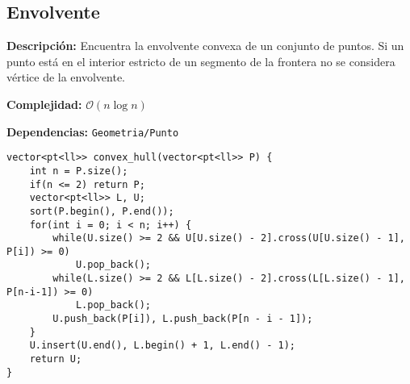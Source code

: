 \documentclass[twocolumn]{article}
\begin{document}
\subsection{Envolvente}
\begin{footnotesize}{\bf Descripción: } Encuentra la envolvente convexa de un conjunto de puntos. Si un punto está en el interior estricto de un segmento de la frontera no se considera vértice de la envolvente.


{\bf Complejidad: } $\mathcal{O}(n \log n)$


{\bf Dependencias: } \texttt{Geometria/Punto}
\end{footnotesize}\lstset{basicstyle=\footnotesize\ttfamily,breaklines=true,tabsize=2,language=C++,frame=leftline, numbers=left, numberstyle=\tiny, numbersep=5pt}
\begin{lstlisting}
vector<pt<ll>> convex_hull(vector<pt<ll>> P) {
	int n = P.size();
	if(n <= 2) return P;
	vector<pt<ll>> L, U;
	sort(P.begin(), P.end());
	for(int i = 0; i < n; i++) {
		while(U.size() >= 2 && U[U.size() - 2].cross(U[U.size() - 1], P[i]) >= 0)
			U.pop_back();
		while(L.size() >= 2 && L[L.size() - 2].cross(L[L.size() - 1], P[n-i-1]) >= 0)
			L.pop_back();
		U.push_back(P[i]), L.push_back(P[n - i - 1]);
	}
	U.insert(U.end(), L.begin() + 1, L.end() - 1);
	return U;
}
\end{lstlisting}
\end{document}
